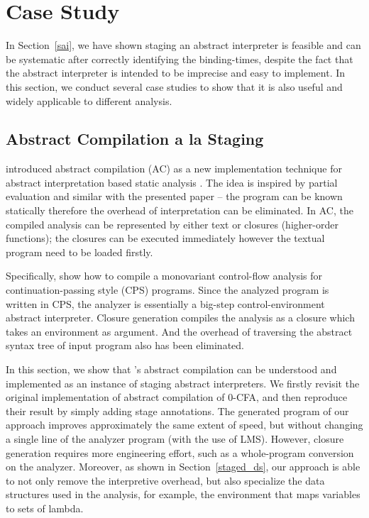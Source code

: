 \section{Case Study} \label{cases_study}

In Section~\ref{sai}, we have shown staging an abstract interpreter is feasible and can be 
systematic after correctly identifying the binding-times, despite the fact that the abstract 
interpreter is intended to be imprecise and easy to implement. 
In this section, we conduct several case studies to show that it is also useful and widely
applicable to different analysis.

\subsection{Abstract Compilation a la Staging} \label{cs_ac}

\citeauthor{Boucher:1996:ACN:647473.727587} introduced abstract compilation (AC) as a new
implementation technique for abstract interpretation based static analysis \cite{Boucher:1996:ACN:647473.727587}.
The idea is inspired by partial evaluation and similar with the presented paper -- the program can be known 
statically therefore the overhead of interpretation can be eliminated. 
In AC, the compiled analysis can be represented by either text or closures (higher-order functions);
the closures can be executed immediately however the textual program need to be loaded firstly.

Specifically, \citeauthor{Boucher:1996:ACN:647473.727587} show how to compile a monovariant control-flow 
analysis \cite{Shivers:1991:SSC:115865.115884, Shivers:1988:CFA:53990.54007} 
for continuation-passing style (CPS) programs. Since the analyzed program is written in CPS, the analyzer 
is essentially a big-step control-environment abstract interpreter.
Closure generation compiles the analysis as a closure which takes an environment as argument.
And the overhead of traversing the abstract syntax tree of input program also has been eliminated.

In this section, we show that \citeauthor{Boucher:1996:ACN:647473.727587}'s abstract compilation can be 
understood and implemented as an instance of staging abstract interpreters.
We firstly revisit the original implementation of abstract compilation of 0-CFA,
and then reproduce their result by simply adding stage annotations.
The generated program of our approach improves approximately the same extent of speed,
but without changing a single line of the analyzer program (with the use of LMS).
However, closure generation requires more engineering effort, such as a whole-program 
conversion on the analyzer. Moreover, as shown in Section~\ref{staged_ds}, 
our approach is able to not only remove the interpretive overhead, but also specialize 
the data structures used in the analysis, for example, the environment that maps variables to sets of lambda.

